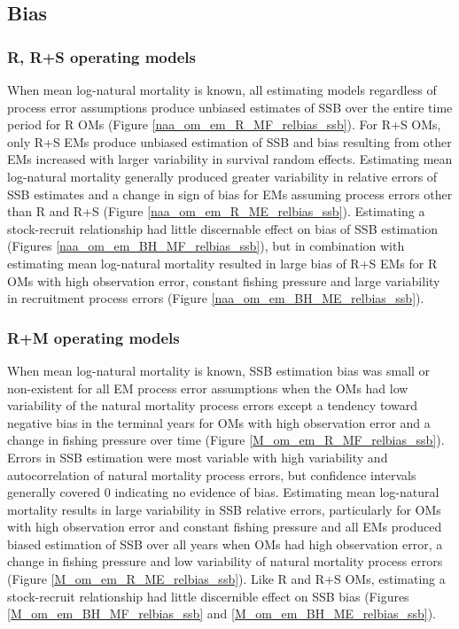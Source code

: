 \documentclass[
  12pt,
]{article}
\begin{document}
\hypertarget{bias-1}{%
\subsection*{Bias}\label{bias-1}}

\hypertarget{r-rs-operating-models-3}{%
\subsubsection*{R, R+S operating models}\label{r-rs-operating-models-3}}

When mean log-natural mortality is known, all estimating models
regardless of process error assumptions produce unbiased estimates of
SSB over the entire time period for R OMs (Figure
\ref{naa_om_em_R_MF_relbias_ssb}). For R+S OMs, only R+S EMs produce
unbiased estimation of SSB and bias resulting from other EMs increased
with larger variability in survival random effects. Estimating mean
log-natural mortality generally produced greater variability in relative
errors of SSB estimates and a change in sign of bias for EMs assuming
process errors other than R and R+S (Figure
\ref{naa_om_em_R_ME_relbias_ssb}). Estimating a stock-recruit
relationship had little discernable effect on bias of SSB estimation
(Figures \ref{naa_om_em_BH_MF_relbias_ssb}), but in combination with
estimating mean log-natural mortality resulted in large bias of R+S EMs
for R OMs with high observation error, constant fishing pressure and
large variability in recruitment process errors (Figure
\ref{naa_om_em_BH_ME_relbias_ssb}).

\hypertarget{rm-operating-models-3}{%
\subsubsection*{R+M operating models}\label{rm-operating-models-3}}

When mean log-natural mortality is known, SSB estimation bias was small
or non-existent for all EM process error assumptions when the OMs had
low variability of the natural mortality process errors except a
tendency toward negative bias in the terminal years for OMs with high
observation error and a change in fishing pressure over time (Figure
\ref{M_om_em_R_MF_relbias_ssb}). Errors in SSB estimation were most
variable with high variability and autocorrelation of natural mortality
process errors, but confidence intervals generally covered 0 indicating
no evidence of bias. Estimating mean log-natural mortality results in
large variability in SSB relative errors, particularly for OMs with high
observation error and constant fishing pressure and all EMs produced
biased estimation of SSB over all years when OMs had high observation
error, a change in fishing pressure and low variability of natural
mortality process errors (Figure \ref{M_om_em_R_ME_relbias_ssb}). Like R
and R+S OMs, estimating a stock-recruit relationship had little
discernible effect on SSB bias (Figures \ref{M_om_em_BH_MF_relbias_ssb}
and \ref{M_om_em_BH_ME_relbias_ssb}).
\end{document}
